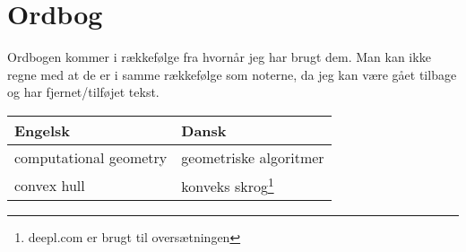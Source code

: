 \chapter{Ordbog}

Ordbogen kommer i rækkefølge fra hvornår jeg har brugt dem. Man kan ikke regne med at de er i samme rækkefølge som noterne, da jeg kan være gået tilbage og har fjernet/tilføjet tekst.

\begin{longtable}[c]{ll}
  \textbf{Engelsk} & \textbf{Dansk} \\ \hline \endfirsthead \endhead
  computational geometry & geometriske algoritmer \\
  convex hull & konveks skrog\footnote{deepl.com er brugt til oversætningen}\\
\end{longtable}
